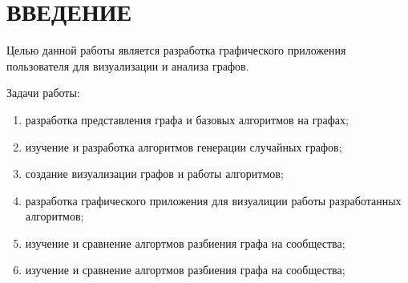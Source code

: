\section*{ВВЕДЕНИЕ}
Целью данной работы является разработка графического
приложения пользователя для визуализации 
и анализа графов.

Задачи  работы:
\begin{enumerate}
    \item разработка представления графа и базовых алгоритмов на
        графах;
    \item изучение и разработка алгоритмов генерации случайных
        графов;
    \item создание визуализации графов и работы алгоритмов;
    \item разработка графического приложения 
        для визуалиции работы разработанных алгоритмов;
    \item изучение и сравнение алгортмов разбиения графа на сообщества;
    \item изучение и сравнение алгортмов разбиения графа на сообщества;
\end{enumerate}
